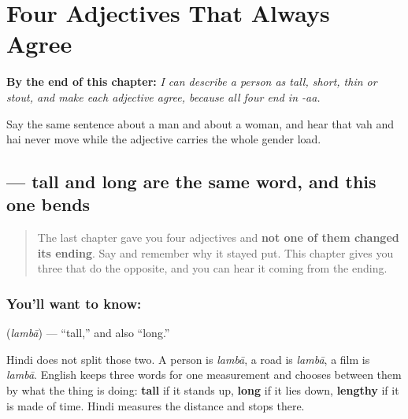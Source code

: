 
\chapter{Four Adjectives That Always Agree}
\label{ch:hi-adjectives-that-bend}

\begin{chapteropening}
\textbf{By the end of this chapter:} \emph{I can describe a person as tall, short, thin or stout, and make each adjective agree, because all four end in -aa.}

Say the same sentence about a man and about a woman, and hear that vah and hai never move while the adjective carries the whole gender load.
\end{chapteropening}

\section[\texorpdfstring{\hi{लंबा} (lambā)}{लंबा (lambā)}]{ — tall and long are the same word, and this one bends}

\label{lesson:HI-C82-lambaa}



\begin{quote}
The last chapter gave you four adjectives and \textbf{not one of them changed its ending}. Say \textbf{} and remember why it stayed put. This chapter gives you three that do the opposite, and you can hear it coming from the ending.
\end{quote}

\subsection*{You'll want to know: }
\textbf{} (\emph{lambā}) — \textquotedblleft{}tall,\textquotedblright{} and also \textquotedblleft{}long.\textquotedblright{}

Hindi does not split those two. A person is \emph{lambā}, a road is \emph{lambā}, a film is \emph{lambā}. English keeps three words for one measurement and chooses between them by what the thing is doing: \textbf{tall} if it stands up, \textbf{long} if it lies down, \textbf{lengthy} if it is made of time. Hindi measures the distance and stops there.

